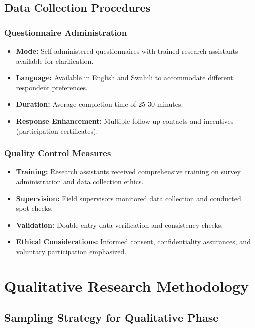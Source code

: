 \subsection{Data Collection Procedures}

\subsubsection{Questionnaire Administration}
\begin{itemize}
    \item \textbf{Mode:} Self-administered questionnaires with trained research assistants available for clarification.
    \item \textbf{Language:} Available in English and Swahili to accommodate different respondent preferences.
    \item \textbf{Duration:} Average completion time of 25-30 minutes.
    \item \textbf{Response Enhancement:} Multiple follow-up contacts and incentives (participation certificates).
\end{itemize}

\subsubsection{Quality Control Measures}
\begin{itemize}
    \item \textbf{Training:} Research assistants received comprehensive training on survey administration and data collection ethics.
    \item \textbf{Supervision:} Field supervisors monitored data collection and conducted spot checks.
    \item \textbf{Validation:} Double-entry data verification and consistency checks.
    \item \textbf{Ethical Considerations:} Informed consent, confidentiality assurances, and voluntary participation emphasized.
\end{itemize}

\section{Qualitative Research Methodology}

\subsection{Sampling Strategy for Qualitative Phase}

